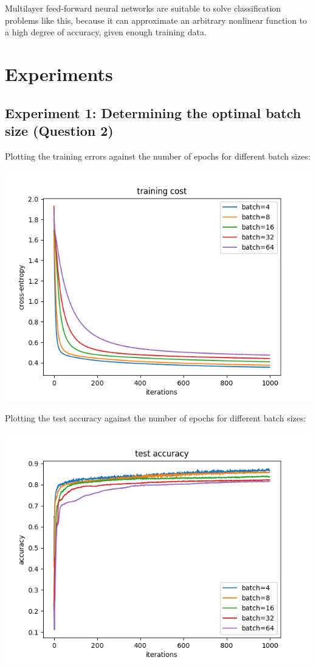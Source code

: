 Multilayer feed-forward neural networks are suitable to solve classification
problems like this, because it can approximate an arbitrary nonlinear
function to a high degree of accuracy, given enough training data.

\section*{Experiments}

\subsection*{Experiment 1: Determining the optimal batch size (Question 2)}

Plotting the training errors against the number of epochs for different batch sizes:

\begin{center}
    \includegraphics[width=\imgw]{images/p1a2_batch_cost.png}   
\end{center}

Plotting the test accuracy against the number of epochs for different batch sizes:

\begin{center}
    \includegraphics[width=\imgw]{images/p1a2_batch_accuracy.png}   
\end{center}

